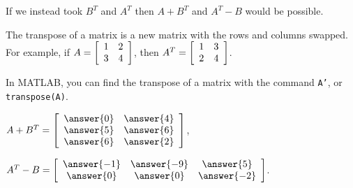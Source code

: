 \documentclass{ximera}
\begin{document}
\begin{exercise}
\begin{enumerate}
        \begin{problem}
        If we instead took $B^T$ and $A^T$ then $A+B^T$ and $A^T-B$ would be possible.

        \begin{hint}
        
          The transpose of a matrix is a new matrix with the rows and columns swapped. For example, if $A = \startmat{cc} 1 & 2 \\ 3 & 4 \stopmat$, then $A^T = \startmat{cc} 1 & 3 \\ 2 & 4 \stopmat$.

          In MATLAB, you can find the transpose of a matrix with the command \texttt{A'}, or \texttt{transpose(A)}.
        \end{hint}
  
        $A+B^T = \startmat{cc}
          \answer{0} & \answer{4}  \\
          \answer{5} & \answer{6}  \\
          \answer{6} & \answer{2} 
        \stopmat$,\quad

        $A^T-B = \startmat{ccc}
          \answer{-1} & \answer{-9} & \answer{5} \\
          \answer{0} & \answer{0} & \answer{-2}
        \stopmat$.

        \end{problem}

  \end{enumerate}
\end{exercise}
\end{document}
